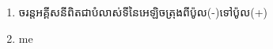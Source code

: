 \documentclass{article}
\author{james1}
\date{\today}
\begin{document}
\begin{enumerate}
\item ចរន្តអគ្គីសនីពិតជាបំលាស់ទីនៃអេឡិចត្រុងពីប៉ូល(-)ទៅប៉ូល(+)
\item me
\end{enumerate}
\end{document}
